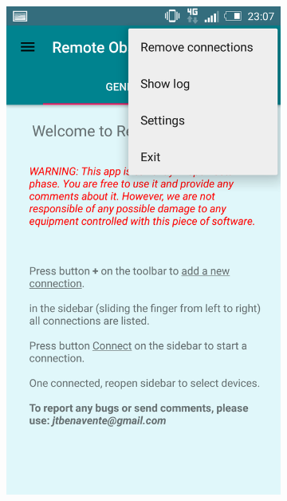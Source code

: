 \begin{figure}
    \centering
    \begin{subfigure}[]{0.4\textwidth}
        \includegraphics[width=\textwidth]{../images/captura8.png}
        \caption{}
        \label{fig:captura6}
    \end{subfigure}
    \begin{subfigure}[]{0.4\textwidth}

\end{subfigure}
\end{figure}
